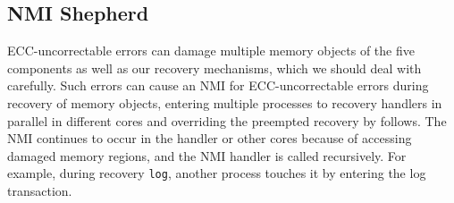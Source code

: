 \subsection{NMI Shepherd}
\label{subsec:nmishepherd}
ECC-uncorrectable errors can damage multiple memory objects of the five components as well as our recovery mechanisms, which we should deal with carefully. Such errors can cause an NMI for ECC-uncorrectable errors during recovery of memory objects, entering multiple processes to recovery handlers in parallel in different cores and overriding the preempted recovery by follows.
The NMI continues to occur in the handler or other cores because of accessing damaged memory regions, and the NMI handler is called recursively. For example, during recovery \texttt{log}, another process touches it by entering the log transaction.


